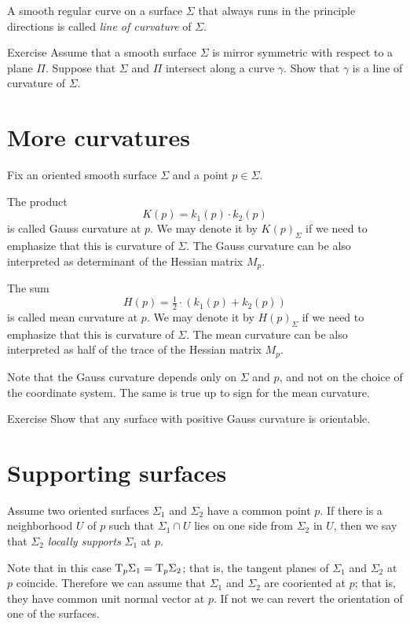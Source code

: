 A smooth regular curve on a surface $\Sigma$ that always runs in the principle directions is called \emph{line of curvature} of $\Sigma$.  

\begin{thm}{Exercise}\label{ex:line-of-curvature}
Assume that a smooth surface $\Sigma$ is mirror symmetric with respect to  a plane $\Pi$.
Suppose that $\Sigma$ and $\Pi$ intersect along a curve $\gamma$.
Show that $\gamma$ is a line of curvature of $\Sigma$.
\end{thm}


\section*{More curvatures}

Fix an oriented smooth surface $\Sigma$ and a point $p\in\Sigma$.

The product 
\[K(p)=k_1(p)\cdot k_2(p)\]
is called Gauss curvature at $p$.
We may denote it by $K(p)_\Sigma$ if we need to emphasize that this is curvature of $\Sigma$.
The Gauss curvature can be also interpreted as determinant of the Hessian matrix $M_p$.

The sum 
\[H(p)=\tfrac12\cdot(k_1(p)+ k_2(p))\] %
is called mean curvature at $p$.
We may denote it by $H(p)_\Sigma$ if we need to emphasize that this is curvature of $\Sigma$.
The mean curvature can be also interpreted as half of the trace of the Hessian matrix $M_p$. %

Note that the Gauss curvature depends only on $\Sigma$ and $p$,
and not on the choice of the coordinate system.
The same is true up to sign for the mean curvature. 

\begin{thm}{Exercise}\label{ex:gauss+orientable}
Show that any surface with positive Gauss curvature is orientable. 
\end{thm}


\section*{Supporting surfaces}

Assume two oriented surfaces $\Sigma_1$ and $\Sigma_2$ have a common point $p$.
If there is a neighborhood $U$ of $p$ such that $\Sigma_1\cap U$ lies on one side from $\Sigma_2$ in $U$, then we say that $\Sigma_2$ \emph{locally supports} $\Sigma_1$ at $p$.

Note that in this case $\mathrm{T}_p\Sigma_1=\mathrm{T}_p\Sigma_2$; that is, the tangent planes of $\Sigma_1$ and $\Sigma_2$ at $p$ coincide.
Therefore we can assume that $\Sigma_1$ and $\Sigma_2$ are cooriented at $p$;
that is, they have common unit normal vector at $p$.
If not we can revert the orientation of one of the surfaces.

